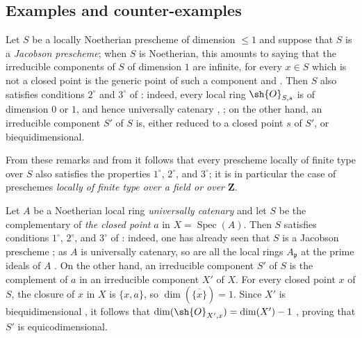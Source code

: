 \subsection{Examples and counter-examples}
\label{subsection:IV.10.7}

\begin{env}[10.7.1]
\label{IV.10.7.1}
Let $S$ be a locally Noetherian prescheme of dimension $\leq 1$ and suppose that $S$ is a \emph{Jacobson prescheme}; when $S$ is Noetherian, this amounts to saying that the irreducible components of $S$ of dimension $1$ are infinite, for every $x\in S$ which is not a closed point is the generic point of such a component  and .
Then $S$ also satisfies conditions $2^\circ$ and $3^\circ$ of : indeed, every local ring $\sh{O}_{S,s}$ is of dimension $0$ or $1$, and hence universally catenary , ; on the other hand, an irreducible component $S'$ of $S$ is, either reduced to a closed point $s$ of $S'$, or biequidimensional.
\end{env}


From these remarks and from  it follows that every prescheme locally of finite type over $S$ also satisfies the properties $1^\circ$, $2^\circ$, and $3^\circ$; it is in particular the case of preschemes \emph{locally of finite type over a field or over $\mathbf{Z}$}.

\begin{env}[10.7.2]
\label{IV.10.7.2}
Let $A$ be a Noetherian local ring \emph{universally catenary} and let $S$ be the complementary of \emph{the closed point} $a$ in $X=\operatorname{Spec}(A)$.
Then $S$ satisfies conditions $1^\circ$, $2^\circ$, and $3^\circ$ of : indeed, one has already seen that $S$ is a Jacobson prescheme ; as $A$ is universally catenary, so are all the local rings $A_\mathfrak{p}$ at the prime ideals of $A$ .
On the other hand, an irreducible component $S'$ of $S$ is the complement of $a$ in an irreducible component $X'$ of $X$. For every closed point $x$ of $S$, the closure of $x$ in $X$ is $\{x,a\}$, so $\dim(\overline{\{x\}})=1$. Since $X'$ is biequidimensional , it follows that $\dim(\sh{O}_{X',x})=\dim(X')-1$ , proving that $S'$ is equicodimensional.
\end{env}

